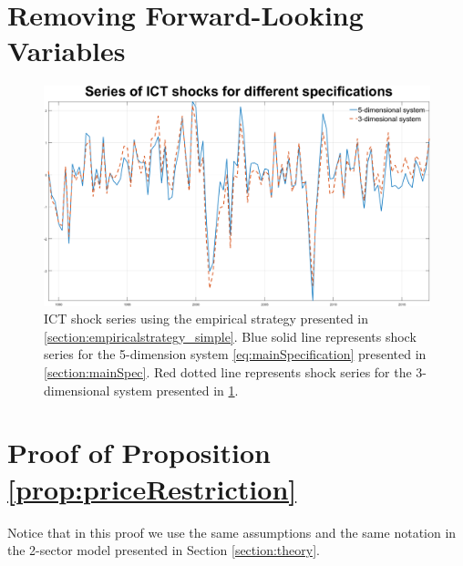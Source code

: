 \documentclass[12pt]{article}
\begin{document}
\newpage

 \section{Removing Forward-Looking Variables}\label{section:removing_FL_Var}
 
 
 	\begin{figure}[h!]
 	\begin{center}
 		\includegraphics[scale=0.35]{MainFigures/Removing_FLVariables}
 		\caption{ICT shock series using the empirical strategy presented in \ref{section:empiricalstrategy_simple}. Blue solid line represents shock series for the 5-dimension system \ref{eq:mainSpecification} presented in \ref{section:mainSpec}. Red dotted line represents shock series for the 3-dimensional system presented in \ref{section:removing_FL_Var}.}
 		\label{fig:shockSeries_removing}
 	\end{center} 
 \end{figure}

\newpage

\section{Proof of Proposition \ref{prop:priceRestriction}}\label{section:proofpriceRestriction}

Notice that in this proof we use the same assumptions and the same notation in the 2-sector model presented in Section \ref{section:theory}.

\
\end{document}

